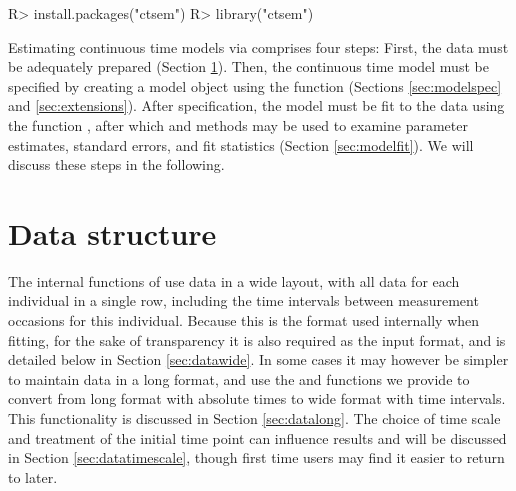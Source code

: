 \documentclass[nojss]{jss}\usepackage[]{graphicx}\usepackage[]{color}
\begin{document}
\begin{Schunk}
\begin{Sinput}
R> install.packages("ctsem")
R> library("ctsem")
\end{Sinput}
\end{Schunk}

Estimating continuous time models via  comprises four steps: First, the data must be adequately prepared (Section \ref{sec:datastructure}). Then, the continuous time model must be specified by creating a  model object using the function  (Sections \ref{sec:modelspec} and \ref{sec:extensions}). After specification, the model must be fit to the data using the function , after which  and  methods may be used to examine parameter estimates, standard errors, and fit statistics (Section \ref{sec:modelfit}). We will discuss these steps in the following.  

\section{Data structure} \label{sec:datastructure}\nopagebreak
The internal functions of  use data in a wide layout, with all data for each individual in a single row, including the time intervals between measurement occasions for this individual. Because this is the format used internally when fitting, for the sake of transparency it is also required as the input format, and is detailed below in Section \ref{sec:datawide}. In some cases it may however be simpler to maintain data in a long format, and use the  and  functions we provide to convert from long format with absolute times to wide format with time intervals. This functionality is discussed in Section \ref{sec:datalong}. The choice of time scale and treatment of the initial time point can influence results and will be discussed in Section \ref{sec:datatimescale}, though first time users may find it easier to return to later.
\end{document}
